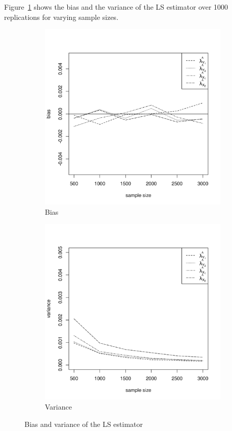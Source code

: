 \documentclass[man, floatsintext]{apa7}
\begin{document}
  Figure~\ref{fig:ls_bias_var} shows the bias and the variance of the LS
  estimator over 1000 replications for varying sample sizes.
  \begin{figure}[t]
    \centering
    \begin{subfigure}[b]{0.45\textwidth}
      \centering
      \includegraphics[width=\textwidth]{fig/bias_uneq_discrim_high.png}
      \caption{Bias}
    \end{subfigure}
    \begin{subfigure}[b]{0.45\textwidth}
      \centering
      \includegraphics[width=\textwidth]{fig/var_uneq_discrim_high.png}
      \caption{Variance}
    \end{subfigure}
    \caption{Bias and variance of the LS estimator}
    \label{fig:ls_bias_var}
  \end{figure}
\end{document}
